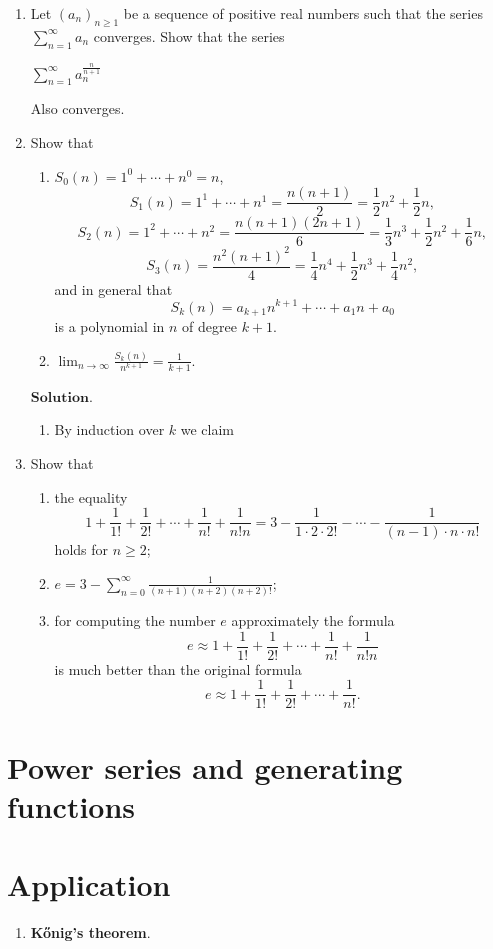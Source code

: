 \documentclass{article}
\theoremstyle{remark}
\begin{document}
    \begin{enumerate}
        \item Let $(a_n)_{n\geq 1}$ be a sequence of positive real numbers such that
        the series $\sum_{n=1}^{\infty}a_n$ converges. Show that the series
        \begin{center}
            $\displaystyle \sum_{n=1}^{\infty}a_n^{\frac{n}{n+1}}$
        \end{center}
        Also converges.\\

        \item Show that
        \begin{enumerate}
            \item[(a)] \( S_0(n) = 1^0 + \cdots + n^0 = n \),
            \[
            S_1(n) = 1^1 + \cdots + n^1 = \frac{n(n+1)}{2} = \frac{1}{2}n^2 + \frac{1}{2}n,
            \]
            \[
            S_2(n) = 1^2 + \cdots + n^2 = \frac{n(n+1)(2n+1)}{6} = \frac{1}{3}n^3 + \frac{1}{2}n^2 + \frac{1}{6}n,
            \]
            \[
            S_3(n) = \frac{n^2(n+1)^2}{4} = \frac{1}{4}n^4 + \frac{1}{2}n^3 + \frac{1}{4}n^2,
            \]
            and in general that
            \[
            S_k(n) = a_{k+1}n^{k+1} + \cdots + a_1n + a_0
            \]
            is a polynomial in \( n \) of degree \( k+1 \).
            \item[(b)] $\lim_{n\to\infty}\frac{S_{k}(n)}{n^{k+1}} = \frac{1}{k+1}$.
        \end{enumerate}
        $\textbf{Solution.}$
        \begin{enumerate}
            \item By induction over $k$ we claim
        \end{enumerate}

        \item Show that  
        \begin{enumerate}
            \item[(a)] the equality  
            \[
            1 + \frac{1}{1!} + \frac{1}{2!} + \cdots + \frac{1}{n!} + \frac{1}{n!n} = 3 - \frac{1}{1 \cdot 2 \cdot 2!} - \cdots - \frac{1}{(n-1) \cdot n \cdot n!}
            \]
            holds for \( n \geq 2 \);
            
            \item[(b)] \( e = 3 - \sum_{n=0}^{\infty} \frac{1}{(n+1)(n+2)(n+2)!} \);
            
            \item[(c)] for computing the number \( e \) approximately the formula 
            \[
            e \approx 1 + \frac{1}{1!} + \frac{1}{2!} + \cdots + \frac{1}{n!} + \frac{1}{n!n}
            \]
            is much better than the original formula 
            \[
            e \approx 1 + \frac{1}{1!} + \frac{1}{2!} + \cdots + \frac{1}{n!}.
            \]
        \end{enumerate}


    \end{enumerate}
\section*{Power series and generating functions}
\section*{Application}
\begin{enumerate}
    \item \textbf{Kőnig's theorem}.
\end{enumerate}
\end{document}
